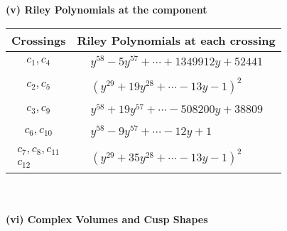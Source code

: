 \documentclass[1p]{elsarticle_modified}
\theoremstyle{definition}
\begin{document}
\newpage\renewcommand{\arraystretch}{1}
\flushleft \textbf{(v) Riley Polynomials at the component}\newline \\
\begin{tabular}{m{50pt}|m{274pt}}
Crossings & \hspace{64pt}Riley Polynomials at each crossing \\
\hline $$\begin{aligned}c_{1},c_{4}\end{aligned}$$&$\begin{aligned}
&y^{58}-5 y^{57}+\cdots+1349912 y+52441
\end{aligned}$\\
\hline $$\begin{aligned}c_{2},c_{5}\end{aligned}$$&$\begin{aligned}
&(y^{29}+19 y^{28}+\cdots-13 y-1)^{2}
\end{aligned}$\\
\hline $$\begin{aligned}c_{3},c_{9}\end{aligned}$$&$\begin{aligned}
&y^{58}+19 y^{57}+\cdots-508200 y+38809
\end{aligned}$\\
\hline $$\begin{aligned}c_{6},c_{10}\end{aligned}$$&$\begin{aligned}
&y^{58}-9 y^{57}+\cdots-12 y+1
\end{aligned}$\\
\hline $$\begin{aligned}c_{7},c_{8},c_{11}\\c_{12}\end{aligned}$$&$\begin{aligned}
&(y^{29}+35 y^{28}+\cdots-13 y-1)^{2}
\end{aligned}$\\
\hline
\end{tabular}\\~\\
\newpage\flushleft \textbf{(vi) Complex Volumes and Cusp Shapes}
\end{document}
